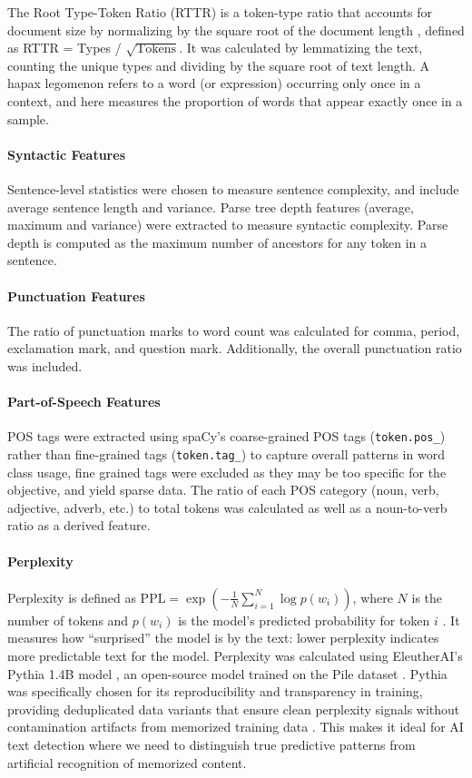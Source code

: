 \documentclass[11pt]{article}
\begin{document}
The Root Type-Token Ratio (RTTR) is a token-type ratio that accounts for document size by normalizing by the square root of the document length \citep{REVIRIEGO2024100602}, defined as RTTR = Types / $\sqrt{\mathrm{Tokens}}$. It was calculated by lemmatizing the text, counting the unique types and dividing by the square root of text length. A hapax legomenon refers to a word (or expression) occurring only once in a context, and here measures the proportion of words that appear exactly once in a sample.

\paragraph{Syntactic Features}
Sentence-level statistics were chosen to measure sentence complexity, and include average sentence length and variance. Parse tree depth features (average, maximum and variance) were extracted to measure syntactic complexity. Parse depth is computed as the maximum number of ancestors for any token in a sentence.

\paragraph{Punctuation Features}
The ratio of punctuation marks to word count was calculated for comma, period, exclamation mark, and question mark. Additionally, the overall punctuation ratio was included.

\paragraph{Part-of-Speech Features}
POS tags were extracted using spaCy's coarse-grained POS tags (\texttt{token.pos\_}) rather than fine-grained tags (\texttt{token.tag\_}) to capture overall patterns in word class usage, fine grained tags were excluded as they may be too specific for the objective, and yield sparse data. The ratio of each POS category (noun, verb, adjective, adverb, etc.) to total tokens was calculated as well as a noun-to-verb ratio as a derived feature.

\paragraph{Perplexity}
Perplexity is defined as $\mathrm{PPL} = \exp\left(-\frac{1}{N}\sum_{i=1}^N \log p(w_i)\right)$, where $N$ is the number of tokens and $p(w_i)$ is the model's predicted probability for token $i$ \citep{jm3}. It measures how ``surprised'' the model is by the text: lower perplexity indicates more predictable text for the model. Perplexity was calculated using EleutherAI's Pythia 1.4B model \citep{biderman2023pythia}, an open-source model trained on the Pile dataset \citep{pile}. Pythia was specifically chosen for its reproducibility and transparency in training, providing deduplicated data variants that ensure clean perplexity signals without contamination artifacts from memorized training data \citep{biderman2023pythia}. This makes it ideal for AI text detection where we need to distinguish true predictive patterns from artificial recognition of memorized content.
\end{document}
